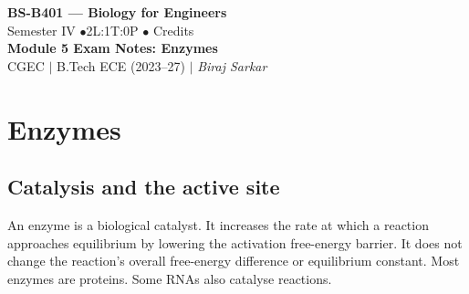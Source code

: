 \documentclass[12pt,a4paper]{article}
\begin{document}
\begin{center}
  {\LARGE\bfseries\color{myred} BS-B401 --- Biology for Engineers}\\[5pt]
  {\normalsize\color{mydark} Semester IV \quad$\bullet$\quad 2L:1T:0P \quad$\bullet$ Credits}\\[3pt]
  {\normalsize\color{myteal}\textbf{Module 5 Exam Notes: Enzymes}}\\[3pt]
  {\small\color{mydark} CGEC \;$|$\; B.Tech ECE (2023--27) \;$|$\; \textit{Biraj Sarkar}}
\end{center}
\vspace{2pt}
\noindent{\color{myred}\rule{\linewidth}{1.5pt}}
\vspace{2pt}

\hypersetup{linkcolor=mydark}
\tableofcontents
\hypersetup{linkcolor=myteal}
\newpage

\section{Enzymes}
\subsection{Catalysis and the active site}
\begin{tcolorbox}[defbox, title={Enzyme}]
An enzyme is a biological catalyst. It increases the rate at which a reaction approaches equilibrium by lowering the activation free-energy barrier. It does not change the reaction's overall free-energy difference or equilibrium constant. Most enzymes are proteins. Some RNAs also catalyse reactions.
\end{tcolorbox}
\end{document}
